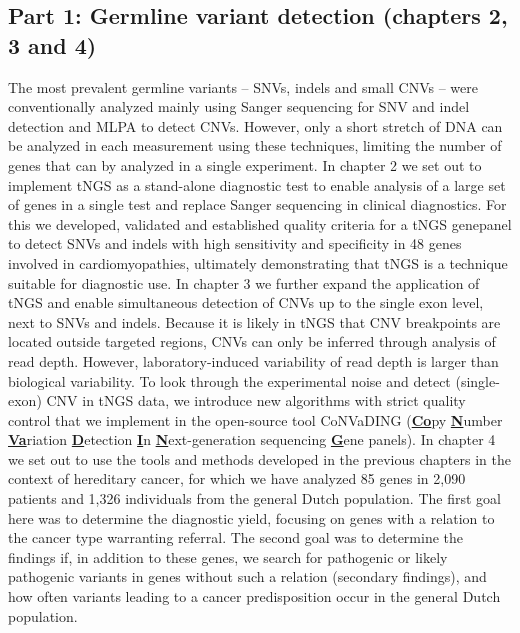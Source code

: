 \subsection{Part 1:  Germline variant detection  (chapters 2, 3 and 4)}\label{Part 1}
The most prevalent germline variants – SNVs, indels and small CNVs – were conventionally analyzed mainly using Sanger sequencing for SNV and indel detection and MLPA to detect CNVs. 
However, only a short stretch of DNA can be analyzed in each measurement using these techniques, limiting the number of genes that can by analyzed in a single experiment. 
In chapter 2 we set out to implement tNGS as a stand-alone diagnostic test to enable analysis of a large set of genes in a single test and replace Sanger sequencing in clinical diagnostics. For this we developed, validated and established quality criteria for a tNGS genepanel to detect SNVs and indels with high sensitivity and specificity in 48 genes involved in cardiomyopathies, ultimately demonstrating that tNGS is a technique suitable for diagnostic use. 
In chapter 3 we further expand the application of tNGS and enable simultaneous detection of CNVs up to the single exon level, next to SNVs and indels. 
Because it is likely in tNGS that CNV breakpoints are located outside targeted regions, CNVs can only be inferred through analysis of read depth. 
However, laboratory-induced variability of read depth is larger than biological variability. 
To look through the experimental noise and detect (single-exon) CNV in tNGS data, we introduce new algorithms with strict quality control that we implement in the open-source tool CoNVaDING (\textbf{\underline{Co}}py \textbf{\underline{N}}umber \textbf{\underline{Va}}riation \textbf{\underline{D}}etection \textbf{\underline{I}}n \textbf{\underline{N}}ext-generation sequencing \textbf{\underline{G}}ene panels). 
In chapter 4 we set out to use the tools and methods developed in the previous chapters in the context of hereditary cancer, for which we have analyzed 85 genes in 2,090 patients and 1,326 individuals from the general Dutch population. 
The first goal here was to determine the diagnostic yield, focusing on genes with a relation to the cancer type warranting referral. 
The second goal was to determine the findings if, in addition to these genes, we search for pathogenic or likely pathogenic variants in genes without such a relation (secondary findings), and how often variants leading to a cancer predisposition occur in the general Dutch population. 

